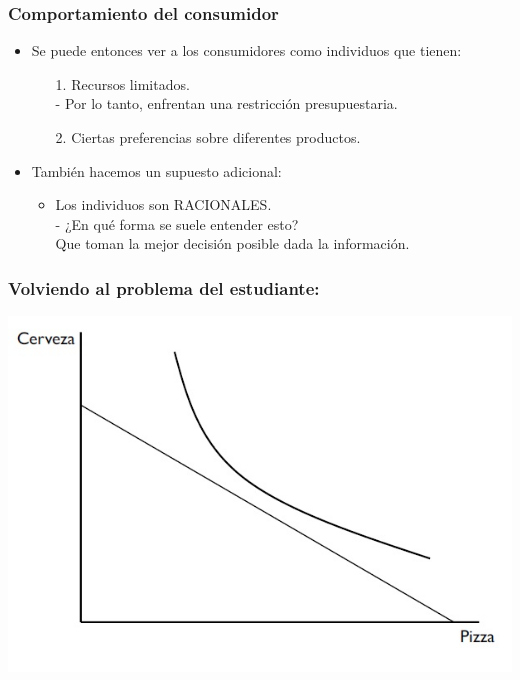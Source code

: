 \documentclass{beamer}
\begin{document}
\begin{frame}
\frametitle{Comportamiento del consumidor}
\begin{itemize}
    \item Se puede entonces ver a los consumidores como individuos que tienen: 
    \vspace{0mm}
    \begin{itemize}
        \item[1.] Recursos limitados. \\
        - Por lo tanto, enfrentan una restricción presupuestaria. \vspace{2mm}
        \item[2.] Ciertas preferencias sobre diferentes productos. \\ \vspace{2mm}
    \end{itemize}
    
    \item También hacemos un supuesto adicional: \vspace{2mm}
    \begin{itemize}
    \item Los individuos son RACIONALES. \\ \vspace{2mm}
    - ¿En qué forma se suele entender esto?
      \\ Que toman la mejor decisión posible dada la información.
    \end{itemize}
\end{itemize} 
\end{frame}

\begin{frame}
\frametitle{Volviendo al problema del estudiante:}
\centering
\includegraphics[scale=0.65]{Slides Principios de Economia/Figures/Tema_02.18_rp16.jpg}
\end{frame}
\end{document}
